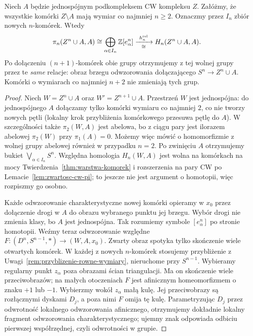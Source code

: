 \begin{lemat}
\label{lem:pierwsze-komorki-pi}
Niech $A$ będzie jednospójnym
podkompleksem CW kompleksu $Z$.
Załóżmy, że wszystkie komórki
$Z\setminus A$ mają wymiar
co najmniej $n\geq2$.
Oznaczmy przez $I_n$
zbiór nowych $n$-komórek.
Wtedy
\[
 \pi_n(Z^n\cup A,A)
 \cong\bigoplus_{\alpha\in I_n}\mathbb{Z}[e_\alpha^n]
 \xrightarrow[\cong]{\ h_n^{\mathrm{rel}}\ }
 H_n(Z^n\cup A,A).
\]
Po dołączeniu $(n+1)$-komórek
obie grupy otrzymujemy
z tej wolnej grupy przez
te \emph{same} relacje:
obraz brzegu odwzorowania
dołączającego $S^n\to
Z^n\cup A$. Komórki
o wymiarach co najmniej
$n+2$ nie zmieniają
tych grup.
\end{lemat}
\begin{proof}
Niech $W=Z^n\cup A$ oraz $W'=Z^{n+1}\cup A$.
Przestrzeń $W$ jest jednospójna: do jednospójnego $A$
dołączamy tylko komórki wymiaru co najmniej $2$, co nie tworzy
nowych pętli (lokalny krok przybliżenia komórkowego przesuwa pętlę do $A$).
W szczególności także $\pi_2(W,A)$ jest abelowa, bo z ciągu pary
jest ilorazem abelowej $\pi_2(W)$ przy $\pi_1(A)=0$.
Możemy więc mówić o homomorfizmie z wolnej grupy abelowej
również w przypadku $n=2$.
Po zwinięciu $A$
otrzymujemy bukiet
$\bigvee_{\alpha\in I_n}S^n$.
Względna homologia
$H_n(W,A)$ jest
wolna na komórkach
na mocy
Twierdzenia~\ref{thm:warstwa-komorek}
i rozszerzenia na pary CW po Lemacie~\ref{lem:zwartosc-cw-pi};
to jeszcze nie jest
argument o homotopii,
więc rozpiszmy go
osobno.

Każde odwzorowanie charakterystyczne nowej komórki opieramy w $x_0$
przez dołączenie drogi w $A$ do obrazu wybranego punktu jej brzegu.
Wybór drogi nie zmienia klasy, bo $A$ jest jednospójna.
Tak rozumiemy symbole $[e_\alpha^n]$ po stronie homotopii.
Weźmy teraz odwzorowanie względne
$F:(D^n,S^{n-1},*)\to(W,A,x_0)$.
Zwarty obraz spotyka
tylko skończenie wiele
otwartych komórek.
W każdej z nowych $n$-komórek stosujemy przybliżenie
z Uwagi~\ref{rem:przyblizenie-rowne-wymiary}, nieruchome przy $S^{n-1}$.
Wybieramy regularny punkt $z_\alpha$ poza obrazami ścian triangulacji.
Ma on skończenie wiele przeciwobrazów; na małych otoczeniach
$F$ jest afinicznym homeomorfizmem o znaku $+1$ lub $-1$.
Wybierzmy wokół $z_\alpha$ małą kulę. Jej przeciwobrazy są rozłącznymi
dyskami $D_j$, a poza nimi $F$ omija tę kulę.
Parametryzując $D_j$ przez odwrotność lokalnego odwzorowania afinicznego,
otrzymujemy dokładnie lokalny fragment odwzorowania charakterystycznego;
ujemny znak odpowiada odbiciu pierwszej współrzędnej, czyli odwrotności w grupie.


\end{proof}
